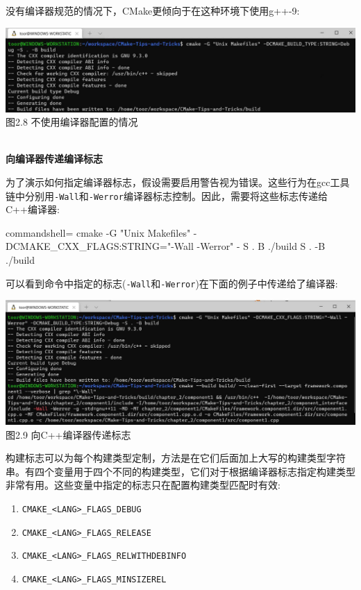 没有编译器规范的情况下，CMake更倾向于在这种环境下使用g++-9:

\begin{center}
\includegraphics[width=1.\textwidth]{content/1/chapter2/images/8.jpg}\\
图2.8 不使用编译器配置的情况
\end{center}

\hspace*{\fill} \\ %
\noindent
\textbf{向编译器传递编译标志}

为了演示如何指定编译器标志，假设需要启用警告视为错误。这些行为在gcc工具链中分别用\texttt{-Wall}和\texttt{-Werror}编译器标志控制。因此，需要将这些标志传递给C++编译器:

\begin{tcblisting}{commandshell={}}
cmake -G "Unix Makefiles" -DCMAKE_CXX_FLAGS:STRING="-Wall
  -Werror" - S . B ./build S . -B ./build
\end{tcblisting}

可以看到命令中指定的标志(\texttt{-Wall}和\texttt{-Werror})在下面的例子中传递给了编译器:

\begin{center}
\includegraphics[width=1.\textwidth]{content/1/chapter2/images/9.jpg}\\
图2.9 向C++编译器传递标志
\end{center}

构建标志可以为每个构建类型定制，方法是在它们后面加上大写的构建类型字符串。有四个变量用于四个不同的构建类型，它们对于根据编译器标志指定构建类型非常有用。这些变量中指定的标志只在配置构建类型匹配时有效:

\begin{enumerate}
\item 
\texttt{CMAKE\_<LANG>\_FLAGS\_DEBUG}

\item 
\texttt{CMAKE\_<LANG>\_FLAGS\_RELEASE}

\item 
\texttt{CMAKE\_<LANG>\_FLAGS\_RELWITHDEBINFO}

\item 
\texttt{CMAKE\_<LANG>\_FLAGS\_MINSIZEREL}
\end{enumerate}

